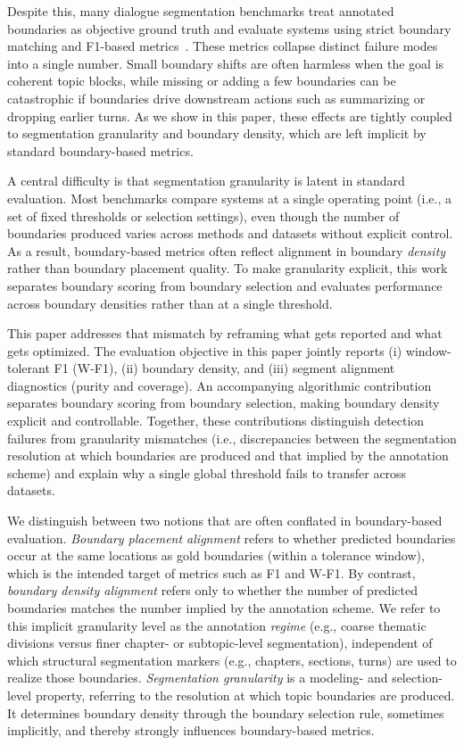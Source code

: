\documentclass{article}
\begin{document}
Despite this, many dialogue segmentation benchmarks treat annotated
boundaries as objective ground truth and evaluate systems using strict
boundary matching and F1-based metrics~\cite{vanrijsbergen1979}. These
metrics collapse distinct failure modes into a single number. Small
boundary shifts are often harmless when the goal is coherent topic
blocks, while missing or adding a few boundaries can be catastrophic
if boundaries drive downstream actions such as summarizing or dropping
earlier turns. As we show in this paper, these effects are tightly coupled to
segmentation granularity and boundary density, which are left implicit
by standard boundary-based metrics.

A central difficulty is that segmentation granularity is latent in
standard evaluation. Most benchmarks compare systems at a single
operating point (i.e., a set of fixed thresholds or selection
settings), even though the number of boundaries produced varies across
methods and datasets without explicit control. As a result,
boundary-based metrics often reflect alignment in boundary
\emph{density} rather than boundary placement quality. To make
granularity explicit, this work separates boundary scoring from
boundary selection and evaluates performance across boundary densities
rather than at a single threshold.

This paper addresses that mismatch by reframing what gets reported and
what gets optimized. The evaluation objective in this paper jointly
reports (i) window-tolerant F1 (W-F1), (ii) boundary density, and
(iii) segment alignment diagnostics (purity and coverage). An
accompanying algorithmic contribution separates boundary scoring from
boundary selection, making boundary density explicit and controllable.
Together, these contributions distinguish detection failures from
granularity mismatches (i.e., discrepancies between the segmentation
resolution at which boundaries are produced and that implied by the
annotation scheme) and explain why a single global threshold fails to
transfer across datasets.

We distinguish between two notions that are often conflated in
boundary-based evaluation. \emph{Boundary placement alignment} refers
to whether predicted boundaries occur at the same locations as gold
boundaries (within a tolerance window), which is the intended target
of metrics such as F1 and W-F1. By contrast, \emph{boundary density
alignment} refers only to whether the number of predicted boundaries
matches the number implied by the annotation scheme. We refer to this
implicit granularity level as the annotation \emph{regime} (e.g.,
coarse thematic divisions versus finer chapter- or subtopic-level
segmentation), independent of which structural segmentation markers
(e.g., chapters, sections, turns) are used to realize those boundaries.
\emph{Segmentation granularity} is a modeling- and selection-level
property, referring to the resolution at which topic boundaries are
produced. It determines boundary density through the boundary selection
rule, sometimes implicitly, and thereby strongly influences
boundary-based metrics.
\end{document}
